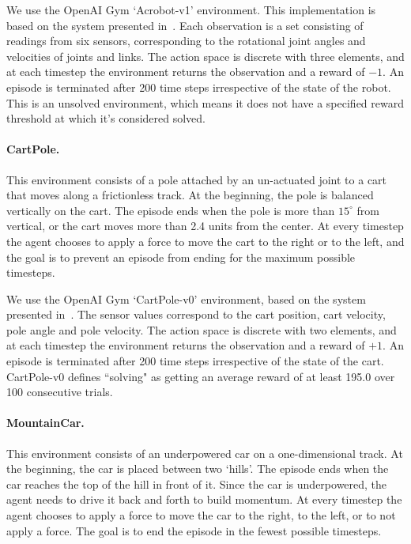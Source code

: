 We use the OpenAI Gym `Acrobot-v1' environment. This implementation is based on the system presented in~\citep{JMLR:v16:geramifard15a}. Each observation is a set consisting of readings from six sensors, corresponding to the rotational joint angles and velocities of joints and links. The action space is discrete with three elements, and at each timestep the environment returns the observation and a reward of $-1$. An episode is terminated after 200 time steps irrespective of the state of the robot. This is an unsolved environment, which means it does not have a specified reward threshold at which it's considered solved.

\paragraph{CartPole.} This environment consists of a pole attached by an un-actuated joint to a cart that moves along a frictionless track. At the beginning, the pole is balanced vertically on the cart. The episode ends when the pole is more than $15^\circ$ from vertical, or the cart moves more than 2.4 units from the center.  At every timestep the agent chooses to apply a force to move the cart to the right or to the left, and the goal is to prevent an episode from ending for the maximum possible timesteps. 

We use the OpenAI Gym `CartPole-v0' environment, based on the system presented in~\citep{Barto83}. The sensor values correspond to the cart position, cart velocity, pole angle and pole velocity. The action space is discrete with two elements, and at each timestep the environment returns the observation and a reward of $+1$. An episode is terminated after 200 time steps irrespective of the state of the cart. CartPole-v0 defines ``solving" as getting an average reward of at least 195.0 over 100 consecutive trials.

\paragraph{MountainCar.} This environment consists of an underpowered car on a one-dimensional track. At the beginning, the car is placed between two `hills'. The episode ends when the car reaches the top of the hill in front of it. Since the car is underpowered, the agent needs to drive it back and forth to build momentum. At every timestep the agent chooses to apply a force to move the car to the right, to the left, or to not apply a force. The goal is to end the episode in the fewest possible timesteps. 

